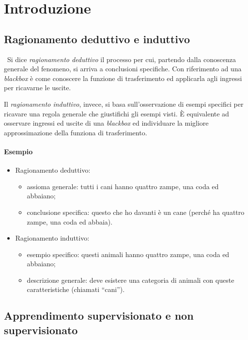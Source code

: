 \section{Introduzione}

\subsection{Ragionamento deduttivo e induttivo}
\
Si dice \emph{ragionamento deduttivo} il processo per cui, partendo dalla conoscenza generale del fenomeno, si arriva a conclusioni specifiche. Con riferimento ad una \emph{blackbox} è come conoscere la funzione di trasferimento ed applicarla agli ingressi per ricavarne le uscite.

Il \emph{ragionamento induttivo}, invece, si basa sull'osservazione di esempi specifici per ricavare una regola generale che giustifichi gli esempi visti. È equivalente ad osservare ingressi ed uscite di una \emph{blackbox} ed individuare la migliore approssimazione della funziona di trasferimento.

\paragraph{Esempio}
\begin{itemize}
  \item  Ragionamento deduttivo:
    \begin{itemize}
      \item assioma generale: tutti i cani hanno quattro zampe, una coda ed abbaiano;
    \item conclusione specifica: questo che ho davanti è un cane (perché ha quattro zampe, una coda ed abbaia).
    \end{itemize}
  \item  Ragionamento induttivo:
  \begin{itemize}
  \item esempio specifico: questi animali hanno quattro zampe, una coda ed abbaiano;  \item descrizione generale: deve esistere una categoria di animali con queste caratteristiche (chiamati ``cani'').
  \end{itemize}
\end{itemize}

\subsection{Apprendimento supervisionato e non supervisionato}

